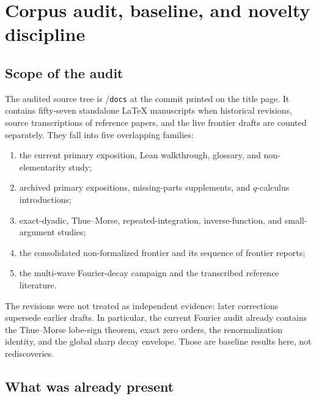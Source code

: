 \documentclass[11pt]{article}
\numberwithin{equation}{section}
\theoremstyle{definition}
\theoremstyle{remark}
\begin{document}
\newpage

\section{Corpus audit, baseline, and novelty discipline}

\subsection{Scope of the audit}

The audited source tree is \repoPartii/\texttt{docs} at the commit printed on the
title page.  It contains fifty-seven standalone \LaTeX{} manuscripts when
historical revisions, source transcriptions of reference papers, and the live
frontier drafts are counted separately.  They fall into five overlapping
families:
\begin{enumerate}
\item the current primary exposition, Lean walkthrough, glossary, and
      non-elementarity study;
\item archived primary expositions, missing-parts supplements, and
      $q$-calculus introductions;
\item exact-dyadic, Thue--Morse, repeated-integration, inverse-function, and
      small-argument studies;
\item the consolidated non-formalized frontier and its sequence of frontier
      reports;
\item the multi-wave Fourier-decay campaign and the transcribed reference
      literature.
\end{enumerate}
The revisions were not treated as independent evidence: later corrections
supersede earlier drafts.  In particular, the current Fourier audit already
contains the Thue--Morse lobe-sign theorem, exact zero orders, the
renormalization identity, and the global sharp decay envelope.  Those are
baseline results here, not rediscoveries.

\subsection{What was already present}
\end{document}
